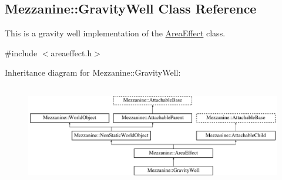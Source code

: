 \hypertarget{classMezzanine_1_1GravityWell}{
\subsection{Mezzanine::GravityWell Class Reference}
\label{classMezzanine_1_1GravityWell}
}


This is a gravity well implementation of the \hyperlink{classMezzanine_1_1AreaEffect}{AreaEffect} class.  




{\ttfamily \#include $<$areaeffect.h$>$}

Inheritance diagram for Mezzanine::GravityWell:\begin{figure}[H]
\begin{center}
\leavevmode
\includegraphics[height=4.423381cm]{classMezzanine_1_1GravityWell}
\end{center}
\end{figure}
